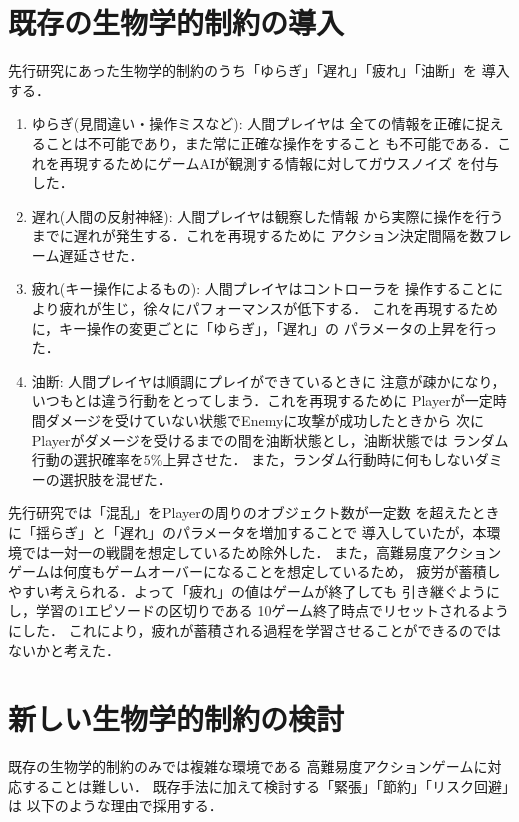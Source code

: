 \documentclass[a4paper,12pt,oneside,openany,titlepage]{jreport}
\begin{document}
 \section{既存の生物学的制約の導入}
 先行研究\cite{morita}にあった生物学的制約のうち「ゆらぎ」「遅れ」「疲れ」「油断」を
 導入する．
 \begin{enumerate}
   \item ゆらぎ(見間違い・操作ミスなど): 人間プレイヤは
   全ての情報を正確に捉えることは不可能であり，また常に正確な操作をすること
   も不可能である．これを再現するためにゲームAIが観測する情報に対してガウスノイズ
   を付与した．
   \item 遅れ(人間の反射神経): 人間プレイヤは観察した情報
   から実際に操作を行うまでに遅れが発生する．これを再現するために
   アクション決定間隔を数フレーム遅延させた．
   \item 疲れ(キー操作によるもの): 人間プレイヤはコントローラを
   操作することにより疲れが生じ，徐々にパフォーマンスが低下する．
   これを再現するために，キー操作の変更ごとに「ゆらぎ」，「遅れ」の
   パラメータの上昇を行った．
   \item 油断: 人間プレイヤは順調にプレイができているときに
   注意が疎かになり，いつもとは違う行動をとってしまう．これを再現するために
   Playerが一定時間ダメージを受けていない状態でEnemyに攻撃が成功したときから
   次にPlayerがダメージを受けるまでの間を油断状態とし，油断状態では
   ランダム行動の選択確率を$5\%$上昇させた．
   また，ランダム行動時に何もしないダミーの選択肢を混ぜた．
 \end{enumerate}
 
 先行研究では「混乱」をPlayerの周りのオブジェクト数が一定数
 を超えたときに「揺らぎ」と「遅れ」のパラメータを増加することで
 導入していたが，本環境では一対一の戦闘を想定しているため除外した．
 また，高難易度アクションゲームは何度もゲームオーバーになることを想定しているため，
 疲労が蓄積しやすい考えられる．よって「疲れ」の値はゲームが終了しても
 引き継ぐようにし，学習の1エピソードの区切りである
 10ゲーム終了時点でリセットされるようにした．
 これにより，疲れが蓄積される過程を学習させることができるのではないかと考えた．
 
 
 \section{新しい生物学的制約の検討}
 既存の生物学的制約のみでは複雑な環境である
 高難易度アクションゲームに対応することは難しい．
 既存手法に加えて検討する「緊張」「節約」「リスク回避」は
 以下のような理由で採用する．
 
\end{document}
